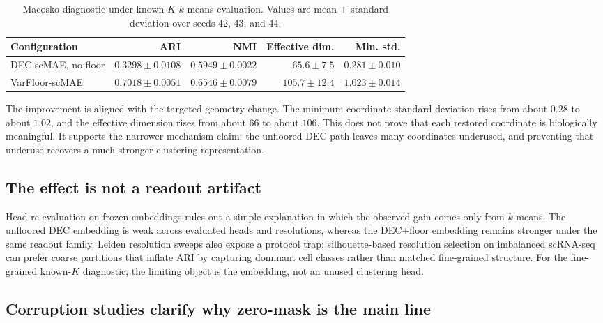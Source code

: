 \documentclass[11pt]{article}
\begin{document}
\begin{table}[ht]
\centering
\caption{Macosko diagnostic under known-$K$ $k$-means evaluation. Values are mean $\pm$ standard deviation over seeds 42, 43, and 44.}
\label{tab:macosko-floor}
\begin{tabular}{lrrrr}
\toprule
Configuration & ARI & NMI & Effective dim. & Min. std. \\
\midrule
DEC-scMAE, no floor & $0.3298 \pm 0.0108$ & $0.5949 \pm 0.0022$ & $65.6 \pm 7.5$ & $0.281 \pm 0.010$ \\
VarFloor-scMAE & $0.7018 \pm 0.0051$ & $0.6546 \pm 0.0079$ & $105.7 \pm 12.4$ & $1.023 \pm 0.014$ \\
\bottomrule
\end{tabular}
\end{table}

The improvement is aligned with the targeted geometry change. The minimum coordinate standard deviation rises from about $0.28$ to about $1.02$, and the effective dimension rises from about $66$ to about $106$. This does not prove that each restored coordinate is biologically meaningful. It supports the narrower mechanism claim: the unfloored DEC path leaves many coordinates underused, and preventing that underuse recovers a much stronger clustering representation.

\subsection{The effect is not a readout artifact}

Head re-evaluation on frozen embeddings rules out a simple explanation in which the observed gain comes only from $k$-means. The unfloored DEC embedding is weak across evaluated heads and resolutions, whereas the DEC+floor embedding remains stronger under the same readout family. Leiden resolution sweeps also expose a protocol trap: silhouette-based resolution selection on imbalanced scRNA-seq can prefer coarse partitions that inflate ARI by capturing dominant cell classes rather than matched fine-grained structure. For the fine-grained known-$K$ diagnostic, the limiting object is the embedding, not an unused clustering head.

\subsection{Corruption studies clarify why zero-mask is the main line}
\end{document}
